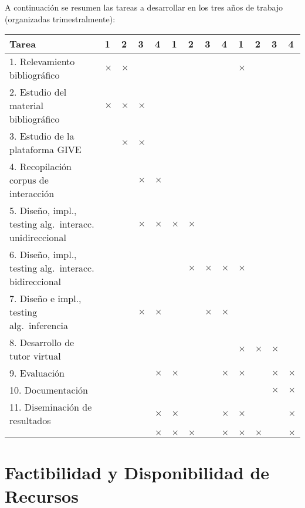 \documentclass[11pt]{article}
\begin{document}
\medskip

\noindent
A continuaci\'on se resumen las tareas a desarrollar en los tres a\~nos de
trabajo (organizadas trimestralmente):

{\footnotesize
\begin{center}
\begin{tabular}{|p{7cm}||p{2mm}|p{2mm}|p{2mm}|p{2mm}||p{2mm}|p{2mm}|p{2mm}|p{2mm
}||p{2mm}|p{2mm}|p{2mm}|p{2mm}||}
\hline
 \rowcolor[rgb]{0.8,0.8,0.8}\hspace{3.5cm}Tarea & 1 & 2 & 3 & 4 & 1 & 2 & 3 & 4
& 1 & 2 & 3 & 4\\
\hline 1. Relevamiento bibliogr\'afico & $\times$ & $\times$
&&&&&&&$\times$&&&\\
\hline 2. Estudio del material bibliogr\'afico & $\times$ & $\times$ & $\times$
&  &&&&&&&&\\
\hline 3. Estudio de la plataforma GIVE & & $\times$ &$\times$&&&&&&&&&\\
\hline 4. Recopilaci\'on corpus de interacci\'on & & & $\times$
&$\times$&&&&&&&&\\
\hline 5. Dise\~no, impl., testing alg.\ interacc. unidireccional & & & $\times$
& $\times$&$\times$&$\times$&&&&&&\\
\hline 6. Dise\~no, impl., testing alg.\ interacc. bidireccional & & &  &
&&$\times$&$\times$&$\times$&$\times$&&&\\
\hline 7. Dise\~no e impl., testing alg.\ inferencia & & & $\times$ &
$\times$&&&$\times$&$\times$&&&&\\
\hline 8. Desarrollo de tutor virtual &&&&&&&&&$\times$&$\times$&$\times$&\\
\hline 9. Evaluaci\'on
&&&&$\times$&$\times$&&&$\times$&$\times$&&$\times$&$\times$\\
\hline 10. Documentaci\'on &&&&&&&&&&&$\times$&$\times$\\
\hline 11. Diseminaci\'on de resultados
&&&&$\times$&$\times$&&&$\times$&$\times$&&&$\times$\\\hline
&&&&$\times$&$\times$&$\times$&&$\times$&$\times$&$\times$&&$\times$\\\hline
\end{tabular}\end{center}
}

\section{Factibilidad y Disponibilidad de Recursos}
\end{document}
